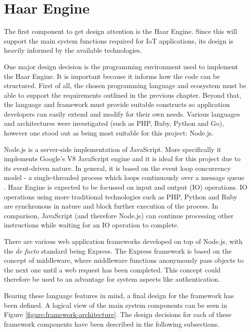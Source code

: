   \section{Haar Engine}
    The first component to get design attention is the Haar Engine. Since this will support the main system functions required for IoT applications, its design is heavily informed by the available technologies.

    One major design decision is the programming environment used to implement the Haar Engine. It is important because it informs how the code can be structured. First of all, the chosen programming language and ecosystem must be able to support the requirements outlined in the previous chapter. Beyond that, the language and framework must provide suitable constructs so application developers can easily extend and modify for their own needs. Various languages and architectures were investigated (such as PHP, Ruby, Python and Go), however one stood out as being most suitable for this project: Node.js.

    Node.js is a server-side implementation of JavaScript. More specifically it implements Google's V8 JavaScript engine and it is ideal for this project due to its event-driven nature. In general, it is based on the event loop concurrency model - a single-threaded process which loops continuously over a message queue \citep{event-loop}. Haar Engine is expected to be focussed on input and output (IO) operations. IO operations using more traditional technologies such as PHP, Python and Ruby are synchronous in nature and block further execution of the process. In comparison, JavaScript (and therefore Node.js) can continue processing other instructions while waiting for an IO operation to complete.

    There are various web application frameworks developed on top of Node.js, with the \textit{de facto} standard being Express. The Express framework is based on the concept of middleware, where middleware functions anonymously pass objects to the next one until a web request has been completed. This concept could therefore be used to an advantage for system aspects like authentication.

    Bearing these language features in mind, a final design for the framework has been defined. A logical view of the main system components can be seen in Figure \ref{figure:framework-architecture}. The design decisions for each of these framework components have been described in the following subsections.

